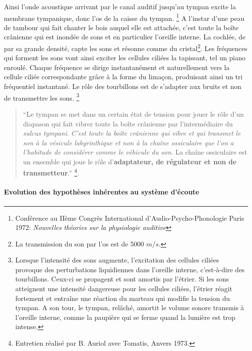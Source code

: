       
Ainsi
l'onde acoustique arrivant par le canal auditif
jusqu'au tympan  excite la membrane tympanique, donc l'os de la caisse du tympan. \footnote{Conférence au IIème Congrès International d'Audio-Psycho-Phonologie
Paris 1972:  \emph{Nouvelles théories sur la physiologie auditive}}
A l'instar d'une
peau de tambour qui fait chanter le bois auquel elle est attachée,
c'est toute la boîte crânienne qui est inondée de sons et en particulier
l'oreille interne. La cochlée, de par sa grande densité, capte les sons
et résonne comme du cristal\footnote{La transmission du son par l'os est de 
5000 $m/s$.}.
Les fréquences qui forment les sons vont ainsi exciter les cellules
ciliées la tapissant, tel un piano enroulé.
Chaque fréquence se dirige instantanément et
naturellement vers la cellule ciliée correspondante grâce à la
forme du limaçon, produisant ainsi un tri fréquentiel 
instantané.
Le rôle des tourbillons est de s'adapter aux bruits
et non de transmettre les sons.
\footnote{Lorsque l'intensité des sons aug\-men\-te,
l'ex\-ci\-ta\-tion des cellules ciliées provoque des perturbations liquidiennes
dans l'oreille interne, c'est-à-dire des tourbillons. Ceux-ci se propagent
et sont amortis par l'étrier. Si les sons atteignent une intensité
dangereuse pour les cellules ciliées, l'étrier réagit fortement et
entraîne une réaction du marteau qui modifie la tension du tympan.
A son tour, le tympan, relâché, amortit le volume sonore transmis
à l'oreille interne, comme la paupière qui se ferme quand la lumière
est trop intense.}


\begin{quotation}
	``Le tympan se met dans un certain état de tension pour jouer le
	rôle d'un diapason qui fait vibrer toute la boîte crânienne
	par l'intermédiaire du \emph{sulcus tympani}. 
	\emph{C'est toute la boîte crânienne qui vibre et qui transmet le son à 
la vésicule labyrinthique et non à la chaîne ossiculaire que l'on a l'habitude 
de considérer comme le véhicule du son.} La chaîne ossiculaire est un ensemble 
qui
	joue le rôle d'\textbf{adaptateur, de régulateur et non de transmetteur}.'' 
	\footnote{Entretien réalisé par B. Auriol avec Tomatis, Anvers 
1973.}.
\end{quotation}


\paragraph{Evolution des hypothèses inhérentes au système d'écoute}



